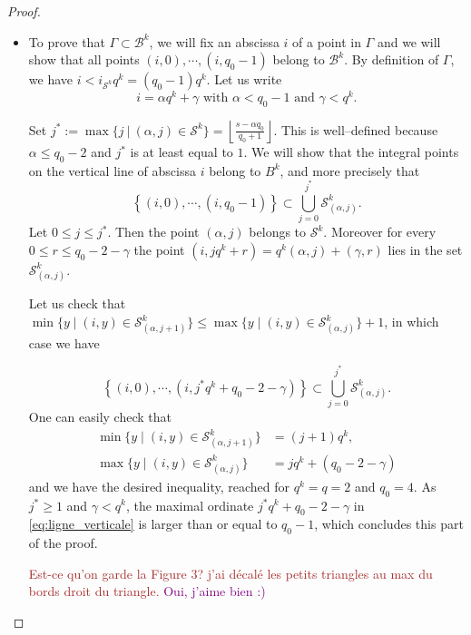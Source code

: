 \documentclass[a4paper]{article}
\newcommand{\calB}{\mathcal{B}}
\newcommand{\calS}{\mathcal{S}}
\newcommand\jade[1]{\textcolor{purple}{#1}}
\newcommand\mathieu[1]{\textcolor{brown}{#1}}
\begin{document}
\begin{proof}
\begin{itemize}
\item To prove that $\Gamma \subset \calB^k$, we will fix an abscissa $i$ of a point in $\Gamma$ and we will show that all points $(i,0),\cdots,(i,q_0-1)$ belong to $\calB^k$. By definition of $\Gamma$, we have $i < i_{\calS^k}q^k=(q_0-1)q^k$. Let us write
    \[i = \alpha q^k+\gamma \text{ with } \alpha <q_0-1 \text{ and } \gamma < q^k.\]
   
   	Set $j^*:=\max \{j \ | \ (\alpha,j) \in \calS^k\} = \left\lfloor \frac{s-\alpha q_0}{q_0+1}\right\rfloor$. This is well--defined because $\alpha \leq q_0 -2$ and $j^*$ is at least equal to $1$. We will show that the integral points on the vertical line of abscissa $i$ belong to $B^k$, and more precisely that
    \[\left\{ (i,0),\cdots,(i,q_0-1) \right\} \subset \bigcup_{j=0}^{j^*} \calS^k_{(\alpha,j)}.\]
    Let $0 \leq j \leq j^*$. Then the point $(\alpha,j)$ belongs to $\calS^k$. Moreover for every $0 \leq r \leq q_0-2-\gamma$ the point $(i,jq^k+r)=q^k(\alpha,j)+(\gamma,r)$ lies in the set $\calS^k_{(\alpha,j)}$.
     
    Let us check that $\min \{y \mid (i,y) \in \calS^k_{(\alpha,j+1)} \} \leq \max \{y \mid (i,y) \in \calS^k_{(\alpha,j)}\}+1$, in which case we have
    
    \begin{equation}\label{eq:ligne_verticale}\left\{ (i,0),\cdots,(i,j^*q^k+q_0-2-\gamma) \right\} \subset \bigcup_{j=0}^{j^*} \calS^k_{(\alpha,j)}.
    \end{equation}
	One can easily check that    
    \begin{align*}
    	\min \{y \mid (i,y) \in \calS^k_{(\alpha,j+1)} \} & =     (j+1)q^k, \\
    	\max \{y \mid (i,y) \in \calS^k_{(\alpha,j)}\} & = jq^k + (q_0-2-\gamma)
    \end{align*}
	and we have the desired inequality, reached for $q^k=q=2$ and $q_0=4$. As $j^* \geq 1$ and $\gamma < q^k$, the maximal ordinate $j^*q^k+q_0-2-\gamma$ in \eqref{eq:ligne_verticale} is larger than or equal to $q_0-1$, which concludes this part of the proof.
	
	
    
    \mathieu{Est-ce qu'on garde la Figure 3? j'ai décalé les petits triangles au max du bords droit du triangle.} \jade{Oui, j'aime bien :)}




\end{itemize}
\end{proof}
\end{document}
